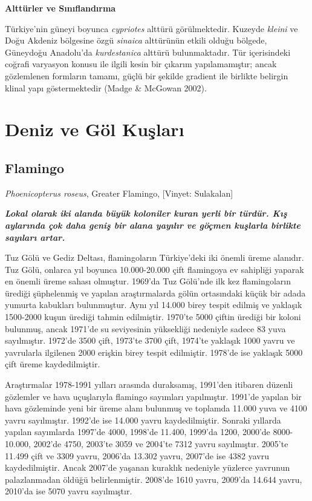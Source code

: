 \documentclass[
  letterpaper,
  DIV=11,
  numbers=noendperiod]{scrreprt}
\begin{document}
\textbf{Alttürler ve Sınıflandırma}

Türkiye'nin güneyi boyunca \emph{cypriotes} alttürü görülmektedir.
Kuzeyde \emph{kleini} ve Doğu Akdeniz bölgesine özgü \emph{sinaica}
alttürünün etkili olduğu bölgede, Güneydoğu Anadolu'da
\emph{kurdestanica} alttürü bulunmaktadır. Tür içerisindeki coğrafi
varyasyon konusu ile ilgili kesin bir çıkarım yapılamamıştır; ancak
gözlemlenen formların tamamı, güçlü bir şekilde gradient ile birlikte
belirgin klinal yapı göstermektedir (Madge \& McGowan 2002).


\chapter{Deniz ve Göl Kuşları}\label{deniz-ve-guxf6l-kuux15flarux131}

\section{Flamingo}\label{flamingo}

\emph{Phoenicopterus roseus}, Greater Flamingo, {[}Vinyet: Sulakalan{]}

\textbf{\emph{Lokal olarak iki alanda büyük koloniler kuran yerli bir
türdür. Kış aylarında çok daha geniş bir alana yayılır ve göçmen
kuşlarla birlikte sayıları artar.}}

Tuz Gölü ve Gediz Deltası, flamingoların Türkiye'deki iki önemli üreme
alanıdır. Tuz Gölü, onlarca yıl boyunca 10.000-20.000 çift flamingoya ev
sahipliği yaparak en önemli üreme sahası olmuştur. 1969'da Tuz Gölü'nde
ilk kez flamingoların ürediği şüphelenmiş ve yapılan araştırmalarda
gölün ortasındaki küçük bir adada yumurta kabukları bulunmuştur. Aynı
yıl 14.000 birey tespit edilmiş ve yaklaşık 1500-2000 kuşun ürediği
tahmin edilmiştir. 1970'te 5000 çiftin ürediği bir koloni bulunmuş,
ancak 1971'de su seviyesinin yüksekliği nedeniyle sadece 83 yuva
sayılmıştır. 1972'de 3500 çift, 1973'te 3700 çift, 1974'te yaklaşık 1000
yavru ve yavrularla ilgilenen 2000 erişkin birey tespit edilmiştir.
1978'de ise yaklaşık 5000 çift üreme kaydedilmiştir.

Araştırmalar 1978-1991 yılları arasında duraksamış, 1991'den itibaren
düzenli gözlemler ve hava uçuşlarıyla flamingo sayımları yapılmıştır.
1991'de yapılan bir hava gözleminde yeni bir üreme alanı bulunmuş ve
toplamda 11.000 yuva ve 4100 yavru sayılmıştır. 1992'de ise 14.000 yavru
kaydedilmiştir. Sonraki yıllarda yapılan sayımlarda 1997'de 4000,
1998'de 11.400, 1999'da 1200, 2000'de 8000-10.000, 2002'de 4750, 2003'te
3059 ve 2004'te 7312 yavru sayılmıştır. 2005'te 11.499 çift ve 3309
yavru, 2006'da 13.302 yavru, 2007'de ise 4382 yavru kaydedilmiştir.
Ancak 2007'de yaşanan kuraklık nedeniyle yüzlerce yavrunun palazlanmadan
öldüğü belirlenmiştir. 2008'de 1610 yavru, 2009'da 14.644 yavru, 2010'da
ise 5070 yavru sayılmıştır.
\end{document}
